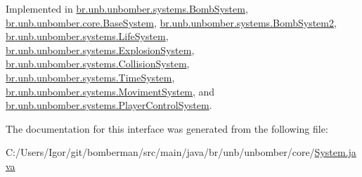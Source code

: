 Implemented in \hyperlink{classbr_1_1unb_1_1unbomber_1_1systems_1_1_bomb_system_a4ba7ac7c485767d8558c0d66d3eaef8d}{br.\+unb.\+unbomber.\+systems.\+Bomb\+System}, \hyperlink{classbr_1_1unb_1_1unbomber_1_1core_1_1_base_system_a0fe91fa7aa0e8108edfff8c2c76ae888}{br.\+unb.\+unbomber.\+core.\+Base\+System}, \hyperlink{classbr_1_1unb_1_1unbomber_1_1systems_1_1_bomb_system2_a0b777b9105d3c81194976ab67f05248d}{br.\+unb.\+unbomber.\+systems.\+Bomb\+System2}, \hyperlink{classbr_1_1unb_1_1unbomber_1_1systems_1_1_life_system_add7a0f79e5f256407ba1d14cf5fc8610}{br.\+unb.\+unbomber.\+systems.\+Life\+System}, \hyperlink{classbr_1_1unb_1_1unbomber_1_1systems_1_1_explosion_system_a10219edb2dd683d8f5e3a19f57a356f3}{br.\+unb.\+unbomber.\+systems.\+Explosion\+System}, \hyperlink{classbr_1_1unb_1_1unbomber_1_1systems_1_1_collision_system_ae4a5755b3e48138cee8350d41fed43b3}{br.\+unb.\+unbomber.\+systems.\+Collision\+System}, \hyperlink{classbr_1_1unb_1_1unbomber_1_1systems_1_1_time_system_a3c7dbe08d7fee626ede56a5825a9289c}{br.\+unb.\+unbomber.\+systems.\+Time\+System}, \hyperlink{classbr_1_1unb_1_1unbomber_1_1systems_1_1_moviment_system_aaf589286eeb9f85097121ff9c9316360}{br.\+unb.\+unbomber.\+systems.\+Moviment\+System}, and \hyperlink{classbr_1_1unb_1_1unbomber_1_1systems_1_1_player_control_system_af3802e7a053a2594598d9c23c566748e}{br.\+unb.\+unbomber.\+systems.\+Player\+Control\+System}.



The documentation for this interface was generated from the following file\+:\begin{DoxyCompactItemize}
\item 
C\+:/\+Users/\+Igor/git/bomberman/src/main/java/br/unb/unbomber/core/\hyperlink{_system_8java}{System.\+java}\end{DoxyCompactItemize}
